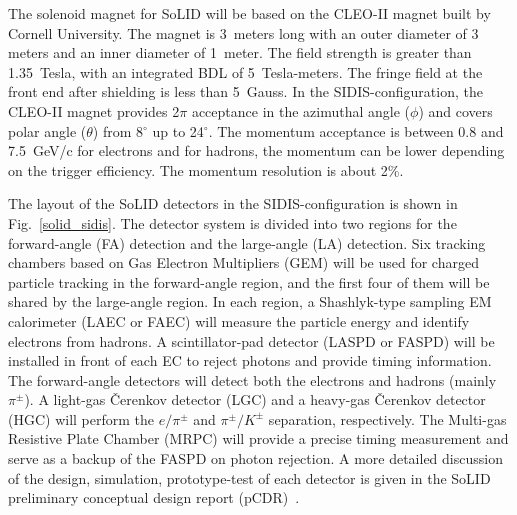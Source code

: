The solenoid magnet for SoLID will be based on the CLEO-II magnet built by
Cornell University. The magnet is 3~meters long with an outer diameter of 3
meters and an inner diameter of 1~meter. The field strength is greater than
1.35~Tesla, with an integrated BDL of 5~Tesla-meters. The fringe field at the
front end after shielding is less than 5~Gauss. In the SIDIS-configuration, the
CLEO-II magnet provides 2$\pi$ acceptance in the azimuthal angle ($\phi$) and
covers polar angle ($\theta$) from 8$^{\circ}$ up to 24$^{\circ}$. The
momentum acceptance is between 0.8 and 7.5~GeV/c for electrons and for hadrons,
the momentum can be lower depending on the trigger efficiency.  The momentum
resolution is about 2\%.

The layout of the SoLID detectors in the SIDIS-configuration is shown in
Fig.~\ref{solid_sidis}. The detector system is divided into two regions for the
forward-angle (FA) detection and the large-angle (LA) detection. Six tracking
chambers based on Gas Electron Multipliers (GEM) will be used for charged
particle tracking in the forward-angle region, and the first four of them will
be shared by the large-angle
region. In each region, a Shashlyk-type sampling EM calorimeter (LAEC or
FAEC) will measure the particle energy and identify electrons from hadrons. A
scintillator-pad detector (LASPD or FASPD) will be installed in front of each
EC to reject photons and provide timing information. The forward-angle
detectors will detect both the electrons and hadrons (mainly $\pi^{\pm}$). A
light-gas \v{C}erenkov detector (LGC) and a heavy-gas \v{C}erenkov detector
(HGC) will perform the $e/\pi^{\pm}$ and $\pi^{\pm}/K^{\pm}$ separation,
respectively. The Multi-gas Resistive Plate Chamber (MRPC) will provide a
precise timing measurement and serve as a backup of the FASPD on photon
rejection. A more detailed discussion of the design, simulation, prototype-test
of each detector is given in the SoLID preliminary conceptual design report
(pCDR)~\cite{solid_pcdr}.

